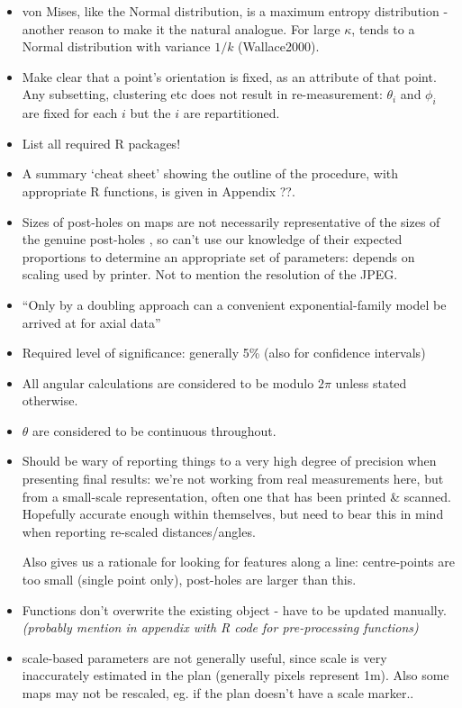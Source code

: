 \documentclass[12pt,fleqn]{article}
\numberwithin{equation}{section}
\numberwithin{figure}{section}
\numberwithin{table}{section}
\begin{document}
\begin{itemize}
\item
von Mises, like the Normal distribution, is a maximum entropy distribution - another reason to make it the natural analogue. For large $\kappa$, tends to a Normal distribution with variance $1/k$ (Wallace2000).

\item
Make clear that a point's orientation is fixed, as an attribute of that point. Any subsetting, clustering etc does not result in re-measurement: $\theta_i$ and $\phi_i$ are fixed for each $i$ but the $i$ are repartitioned.

\item
List all required R packages!

\item
A summary `cheat sheet' showing the outline of the procedure, with appropriate R functions, is given in Appendix ??.

\item
Sizes of post-holes on maps are not necessarily representative of the sizes of the genuine post-holes , so can't use our knowledge of their expected proportions to determine an appropriate set of parameters: depends on scaling used by printer. Not to mention the resolution of the JPEG.

\item 
``Only by a doubling approach can a convenient exponential-family model be arrived at for axial data'' \cite{Arnold2011}

\item
Required level of significance: generally 5\% (also for confidence intervals)

\item
All angular calculations are considered to be modulo $2\pi$ unless stated otherwise.

\item
$\theta$ are considered to be continuous throughout.

\item
Should be wary of reporting things to a very high degree of precision when presenting final results: we're not working from real measurements here, but from a small-scale representation, often one that has been printed \& scanned. Hopefully accurate enough within themselves, but need to bear this in mind when reporting re-scaled distances/angles.

Also gives us a rationale for looking for features along a line: centre-points are too small (single point only), post-holes are larger than this.

\item
Functions don't overwrite the existing object - have to be updated manually.
\textit{(probably mention in appendix with R code for pre-processing functions)
}

\item
scale-based parameters are not generally useful, since scale is very inaccurately estimated in the plan (generally  pixels represent 1m). Also some maps may not be rescaled, eg. if the plan doesn't have a scale marker..

\end{itemize}
\newpage
\end{document}
